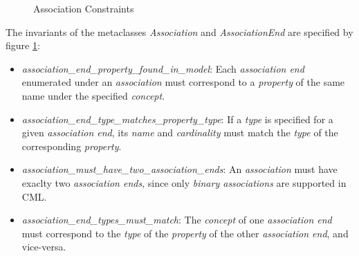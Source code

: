 \begin{figure}

\caption{Association Constraints}
\label{fig:inv:associations}
\end{figure}

The invariants of the metaclasses \emph{Association} and \emph{AssociationEnd}
are specified by figure \ref{fig:inv:associations}:

\begin{itemize}

\item \emph{association\_end\_property\_found\_in\_model}:
Each \emph{association end} enumerated under an \emph{association}
must correspond to a \emph{property} of the same name under the specified \emph{concept}.

\item \emph{association\_end\_type\_matches\_property\_type}:
If a \emph{type} is specified for a given \emph{association end},
its \emph{name} and \emph{cardinality} must match the \emph{type}
of the corresponding \emph{property}.

\item \emph{association\_must\_have\_two\_association\_ends}:
An \emph{association} must have exaclty two \emph{association ends},
since only \emph{binary associations} are supported in CML.

\item \emph{association\_end\_types\_must\_match}:
The \emph{concept} of one \emph{association end} must correspond
to the \emph{type} of the \emph{property} of the other \emph{association end},
and vice-versa.

\end{itemize}
